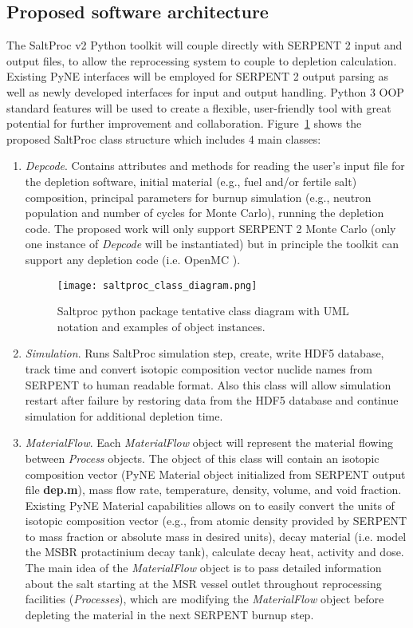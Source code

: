 \subsection{Proposed software architecture}
The SaltProc v2 Python toolkit will couple directly with SERPENT 2 input 
and output files, 
to allow the reprocessing system to couple to depletion calculation. 
Existing PyNE interfaces will be employed for SERPENT 2 output parsing as 
well as newly developed interfaces for input and output handling. 
Python 3 \gls{OOP} 
standard features will be used to create a flexible, user-friendly tool with 
great potential for further improvement and collaboration. 
Figure~\ref{fig:saltproc_class} shows the proposed SaltProc class structure 
 which includes 4 main classes:
\begin{enumerate}
	\item \textit{Depcode}. Contains attributes and methods for 
	reading the user's input file for the depletion software, initial 
	material (e.g., fuel and/or fertile salt) composition, principal 
	parameters for 
	burnup simulation (e.g., neutron population and number of cycles for Monte 
	Carlo), running the depletion code. The proposed work will only 
	support SERPENT 2 Monte Carlo (only 
	one instance of \textit{Depcode} will be instantiated) but in principle the 
	toolkit can support any depletion code (i.e. OpenMC 
	\cite{romano_openmc_2015}).
\begin{figure}[ht!] %
  \texttt{[image: saltproc\_class\_diagram.png]}
  \caption{Saltproc python package tentative class diagram with UML notation 
  and examples of object instances.}
  \label{fig:saltproc_class}
\end{figure}
	\item \textit{Simulation}. Runs SaltProc simulation step, 
	create, write HDF5 database, track time and convert 
	isotopic composition vector nuclide names from SERPENT to human 
	readable format. Also this class will allow simulation restart after 
	failure by restoring data from the HDF5 database and continue simulation 
	for additional depletion time.
	
	\item \textit{MaterialFlow}. Each \textit{MaterialFlow} object 
	will represent the material flowing between \textit{Process} objects. 
	The object of this class will contain an isotopic composition vector 
	(PyNE Material object 
	initialized	from SERPENT output file \textbf{dep.m}), mass flow rate, 
	temperature, density, volume, and void fraction. Existing PyNE Material 
	capabilities allows on to easily convert the units of isotopic 
	composition vector (e.g., from atomic density provided by SERPENT to 
	mass fraction or absolute mass in desired units), decay material 
	(i.e. model the \gls{MSBR} protactinium decay tank), calculate 
	decay heat, activity and dose. The main idea of the \textit{MaterialFlow} 
	object is to pass detailed information about the salt starting at the 
	\gls{MSR} vessel outlet throughout reprocessing facilities 
	(\textit{Processes}), which are modifying the \textit{MaterialFlow} 
	object before depleting the material in the next SERPENT burnup step.
		

\end{enumerate}
